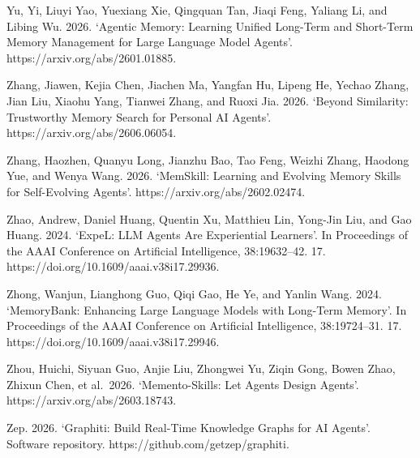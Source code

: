 \documentclass[
  english,
  a4paper,
  DIV=11,
  numbers=noendperiod]{scrreprt}
\begin{document}
Yu, Yi, Liuyi Yao, Yuexiang Xie, Qingquan Tan, Jiaqi Feng, Yaliang Li,
and Libing Wu. 2026. `Agentic Memory: Learning Unified Long-Term and
Short-Term Memory Management for Large Language Model Agents'.
https://arxiv.org/abs/2601.01885.

Zhang, Jiawen, Kejia Chen, Jiachen Ma, Yangfan Hu, Lipeng He, Yechao
Zhang, Jian Liu, Xiaohu Yang, Tianwei Zhang, and Ruoxi Jia. 2026.
`Beyond Similarity: Trustworthy Memory Search for Personal AI Agents'.
https://arxiv.org/abs/2606.06054.

Zhang, Haozhen, Quanyu Long, Jianzhu Bao, Tao Feng, Weizhi Zhang,
Haodong Yue, and Wenya Wang. 2026. `MemSkill: Learning and Evolving
Memory Skills for Self-Evolving Agents'.
https://arxiv.org/abs/2602.02474.

Zhao, Andrew, Daniel Huang, Quentin Xu, Matthieu Lin, Yong-Jin Liu, and
Gao Huang. 2024. `ExpeL: LLM Agents Are Experiential Learners'. In
Proceedings of the AAAI Conference on Artificial Intelligence,
38:19632--42. 17. https://doi.org/10.1609/aaai.v38i17.29936.

Zhong, Wanjun, Lianghong Guo, Qiqi Gao, He Ye, and Yanlin Wang. 2024.
`MemoryBank: Enhancing Large Language Models with Long-Term Memory'. In
Proceedings of the AAAI Conference on Artificial Intelligence,
38:19724--31. 17. https://doi.org/10.1609/aaai.v38i17.29946.

Zhou, Huichi, Siyuan Guo, Anjie Liu, Zhongwei Yu, Ziqin Gong, Bowen
Zhao, Zhixun Chen, et al.~2026. `Memento-Skills: Let Agents Design
Agents'. https://arxiv.org/abs/2603.18743.

Zep. 2026. `Graphiti: Build Real-Time Knowledge Graphs for AI Agents'.
Software repository. https://github.com/getzep/graphiti.
\end{document}

